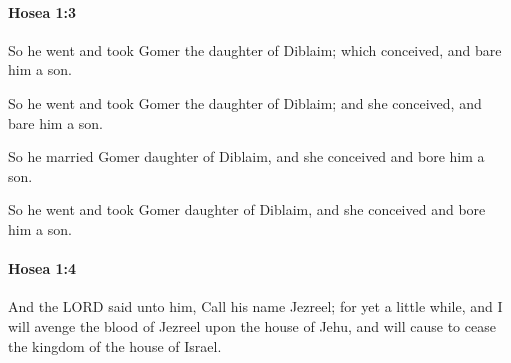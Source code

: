 		\paragraph{Hosea 1:3} %
			\label{HOSEA-1-3}

			So he went and took Gomer the daughter of Diblaim; which conceived, and bare him a son.

			\begin{versebox}
					\item[BHS] 
					\item[LXX] 
					\item[ASV] So he went and took Gomer the daughter of Diblaim; and she conceived, and bare him a son.
					\item[NIV] So he married Gomer daughter of Diblaim, and she conceived and bore him a son.
					\item[NRSV] So he went and took Gomer daughter of Diblaim, and she conceived and bore him a son.
			\end{versebox}

		\paragraph{Hosea 1:4} %
			\label{HOSEA-1-4}

			And the LORD said unto him, Call his name Jezreel; for yet a little while, and I will avenge the blood of Jezreel upon the house of Jehu, and will cause to cease the kingdom of the house of Israel.

